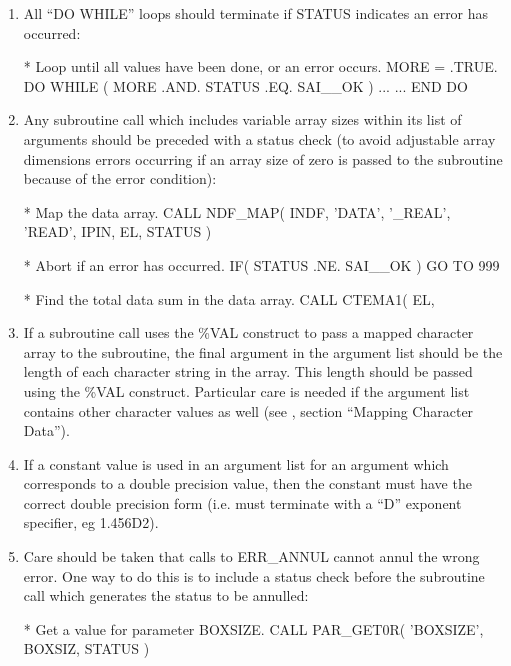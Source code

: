 \documentclass[twoside,11pt,nolof]{starlink}
\begin{document}
\begin{enumerate}
\item All ``{\small DO WHILE}'' loops should terminate if {\small STATUS}
indicates an error has occurred:

\small
\begin{terminalv}
*  Loop until all values have been done, or an error occurs.
     MORE = .TRUE.
     DO WHILE ( MORE .AND. STATUS .EQ. SAI__OK )
        ...
        ...
     END DO
\end{terminalv}
\normalsize

\item Any subroutine call which includes variable array sizes within
its list of arguments should be preceded with a status check (to avoid
adjustable array dimensions errors occurring if an array size of zero
is passed to the subroutine because of the error condition):

\small
\begin{terminalv}
*  Map the data array.
     CALL NDF_MAP( INDF, 'DATA', '_REAL', 'READ', IPIN, EL, STATUS )

*  Abort if an error has occurred.
     IF( STATUS .NE. SAI__OK ) GO TO 999

*  Find the total data sum in the data array.
     CALL CTEMA1( EL, %
\end{terminalv}
\normalsize

\item If a subroutine call uses the {\small \%VAL} construct to pass a
mapped character array to the subroutine, the final argument in the
argument list should be the length of each character string in the
array. This length should be passed using the {\small \%VAL} construct.
Particular care is needed if the argument list contains other character
values as well
(see , section ``Mapping Character Data'').

\item If a constant value is used in an argument list for an argument
which corresponds to a double precision value, then the constant must
have the correct double precision form (i.e. must terminate with a
``D'' exponent specifier, eg 1.456D2).

\item Care should be taken that calls to {\small ERR\_ANNUL} cannot
annul the wrong error. One way to do this is to include a status check
before the subroutine call which generates the status to be annulled:

\small
\begin{terminalv}
*  Get a value for parameter BOXSIZE.
     CALL PAR_GET0R( 'BOXSIZE', BOXSIZ, STATUS )


\end{terminalv}
\end{enumerate}
\end{document}
